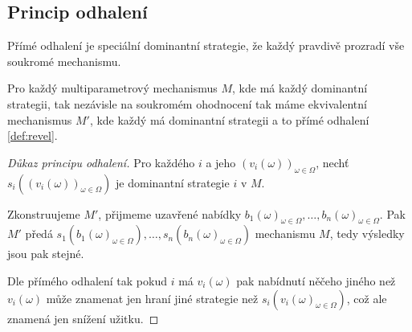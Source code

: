\subsection{Princip odhalení}

\begin{definition}\label{def:revel}
  Přímé odhalení je speciální dominantní strategie, že každý pravdivě prozradí vše soukromé mechanismu. 
\end{definition}

\begin{theorem}
    \label{thm:revelation}
    Pro každý multiparametrový mechanismus $M$, kde má každý dominantní strategii, tak nezávisle na soukromém ohodnocení tak máme ekvivalentní mechanismus $M'$, kde každý má dominantní strategii a to přímé odhalení \ref{def:revel}. 
\end{theorem}
\begin{proof}[Důkaz principu odhalení]
    Pro každého $i$ a jeho $(v_i(\omega))_{\omega \in \Omega}$, nechť $s_i((v_i(\omega))_{\omega \in \Omega})$ je dominantní strategie $i$ v $M$. 

    Zkonstruujeme $M'$, přijmeme uzavřené nabídky $b_1(\omega)_{\omega \in \Omega}, \dots, b_n(\omega)_{\omega \in \Omega}$. 
    Pak $M'$ předá $s_1(b_1(\omega)_{\omega \in \Omega}), \dots, s_n(b_n(\omega)_{\omega \in \Omega})$ mechanismu $M$, tedy výsledky jsou pak stejné. 

    Dle přímého odhalení tak pokud $i$ má $v_i(\omega)$ pak nabídnutí něčeho jiného než $v_i(\omega)$ může znamenat jen hraní jiné strategie než $s_i(v_i(\omega)_{\omega \in \Omega})$, což ale znamená jen snížení užitku. 
\end{proof}

